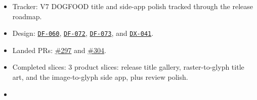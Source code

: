 \begin{itemize}
\tightlist
\item
  Tracker: V7 DOGFOOD title and side-app polish tracked through the release roadmap.
\item
  Design: \href{https://github.com/flyingrobots/bijou/blob/cbd70612140e7a450d764b3c7be1c6af878b99bc/docs/design/DF-060-v7-dogfood-release-title-screen.md}{\texttt{D\allowbreak{}F\allowbreak{}-\allowbreak{}0\allowbreak{}6\allowbreak{}0}}, \href{https://github.com/flyingrobots/bijou/blob/cbd70612140e7a450d764b3c7be1c6af878b99bc/docs/design/DF-072-dogfood-release-title-artifact-gallery.md}{\texttt{D\allowbreak{}F\allowbreak{}-\allowbreak{}0\allowbreak{}7\allowbreak{}2}}, \href{https://github.com/flyingrobots/bijou/blob/cbd70612140e7a450d764b3c7be1c6af878b99bc/docs/design/DF-073-raster-to-glyph-title-art.md}{\texttt{D\allowbreak{}F\allowbreak{}-\allowbreak{}0\allowbreak{}7\allowbreak{}3}}, and \href{https://github.com/flyingrobots/bijou/blob/cbd70612140e7a450d764b3c7be1c6af878b99bc/docs/design/DX-041-image-to-glyph-side-app.md}{\texttt{D\allowbreak{}X\allowbreak{}-\allowbreak{}0\allowbreak{}4\allowbreak{}1}}.
\item
  Landed PRs: \href{https://github.com/flyingrobots/bijou/pull/297}{\#297} and \href{https://github.com/flyingrobots/bijou/pull/304}{\#304}.
\item
  Completed slices: 3 product slices: release title gallery, raster-to-glyph title art, and the image-to-glyph side app, plus review polish.
\item

\end{itemize}
